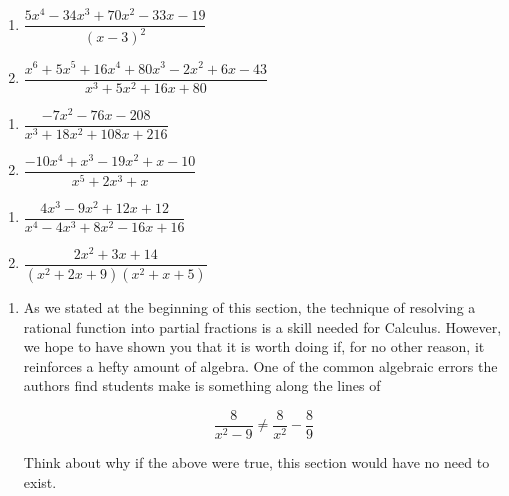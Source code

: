 \begin{multicols}{2}
\begin{enumerate}
\setcounter{enumi}{\value{HW}}

\item $\dfrac{5x^{4} - 34x^{3} + 70x^{2} - 33x - 19}{(x - 3)^{2}}$
\item $\dfrac{x^{6} + 5x^{5} + 16x^{4} + 80x^{3} - 2x^{2} + 6x - 43}{x^{3} + 5x^{2} + 16x + 80}$


\setcounter{HW}{\value{enumi}}
\end{enumerate}
\end{multicols}

\begin{multicols}{2}
\begin{enumerate}
\setcounter{enumi}{\value{HW}}

\item $\dfrac{-7x^{2} - 76x - 208}{x^{3} + 18x^{2} + 108x + 216}$
\item $\dfrac{-10x^{4} + x^{3} - 19x^{2} + x - 10}{x^{5} + 2x^{3} + x}$


\setcounter{HW}{\value{enumi}}
\end{enumerate}
\end{multicols}

\begin{multicols}{2}
\begin{enumerate}
\setcounter{enumi}{\value{HW}}

\item $\dfrac{4x^{3} - 9x^{2} + 12x + 12}{x^{4} - 4x^{3} + 8x^{2} - 16x + 16}$
\item $\dfrac{2x^{2} + 3x + 14}{(x^{2} + 2x + 9)(x^{2} + x + 5)}$ \label{findparfraclast}

\setcounter{HW}{\value{enumi}}
\end{enumerate}
\end{multicols}

\begin{enumerate}
\setcounter{enumi}{\value{HW}}

\item As we stated at the beginning of this section, the technique of resolving a rational function into partial fractions is a skill needed for Calculus.  However, we hope to have shown you that it is worth doing if, for no other reason, it reinforces a hefty amount of algebra.  One of the common algebraic errors the authors find students make is something along the lines of 

\[ \dfrac{8}{x^2 - 9} \neq \dfrac{8}{x^2} - \dfrac{8}{9}\]

Think about  why if the above were true, this section would have no need to exist.

\end{enumerate}

